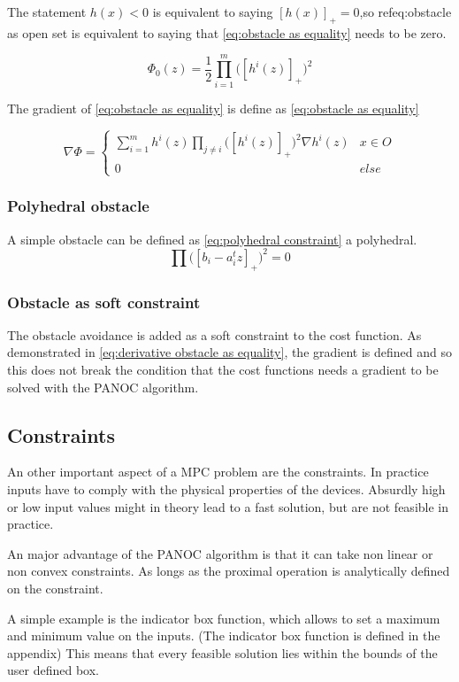 				The statement $h(x)<0$ is equivalent to saying $[h(x)]_+=0$,so ref{eq:obstacle as open set} is equivalent to saying that \eqref{eq:obstacle as equality} needs to be zero.
				
				\begin{equation}
					\Phi_0(z) =  \frac{1}{2} \prod_{i=1}^m \Big( [h^i(z)]_+ \Big)^2
					\label{eq:obstacle as equality}
				\end{equation}
				
				The gradient of \eqref{eq:obstacle as equality} is define as \eqref{eq:obstacle as equality}
				
				\begin{equation}
					\nabla \Phi =
					\begin{cases}
						\sum_{i=1}^{m} h^i(z)\prod_{j \ne i} \Big( [h^i(z)]_+ \Big)^2 \nabla h^i(z)
						& x \in O \\
						0 & else
					\end{cases}
					\label{eq:derivative obstacle as equality}
				\end{equation}
			
			\subsubsection{Polyhedral obstacle}
				A simple obstacle can be defined as \eqref{eq:polyhedral constraint} a polyhedral.
				\begin{equation}
					\prod \Big([b_i - a_i^t z]_+ \Big)^2 = 0
					\label{eq:polyhedral constraint}
				\end{equation}
			
			\subsubsection{Obstacle as soft constraint}
				The obstacle avoidance is added as a soft constraint to the cost function. As demonstrated in \eqref{eq:derivative obstacle as equality}, the gradient is defined and so this does not break the condition that the cost functions needs a gradient to be solved with the PANOC algorithm.
			
		\subsection{Constraints}
			An other important aspect of a MPC problem are the constraints. In practice inputs have to comply with the physical properties of the devices. Absurdly high or low input values might in theory lead to a fast solution, but are not feasible in practice.
			
			An major advantage of the PANOC algorithm is that it can take non linear or non convex constraints. As longs as the proximal operation is analytically defined on the constraint. 
			
			A simple example is the indicator box function, which allows to set a maximum and minimum value on the inputs. (The indicator box function is defined in the appendix) This means that every feasible solution lies within the bounds of the user defined box.